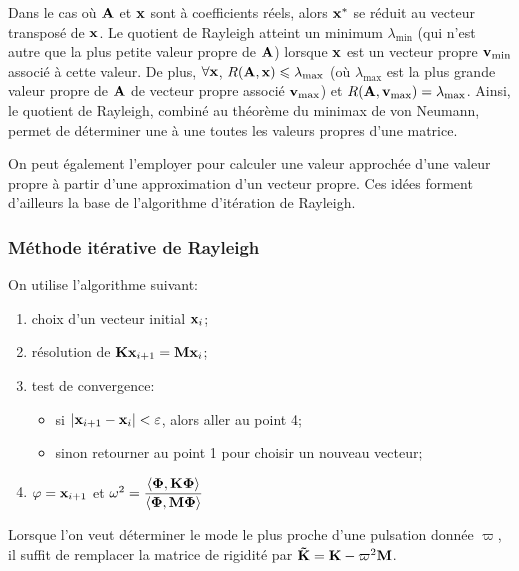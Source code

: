 Dans le cas où $\MM{A}$ et $\VV{x}$ sont à coefficients réels, alors $\VV{x}^{*}$ se réduit au vecteur transposé de $\VV{x}$.
\medskipvm
Le quotient de Rayleigh atteint un minimum $\lambda_{\min}$ (qui n'est autre que la plus petite valeur propre de $\MM{A}$)
lorsque $\VV{x}$ est un vecteur propre $\VV{v}_{\min}$ associé à cette valeur.
\medskipvm
De plus, $\forall \VV{x}$, $R(\MM{A}, \VV{x}) \leq \lambda_{\max}$ (où $\lambda_{\max}$ est la plus grande
valeur propre de $\MM{A}$ de vecteur propre associé $\VV{v}_{\max}$) et $R(\MM{A}, \VV{v}_{\max}) = \lambda_{\max}$.
Ainsi, le quotient de Rayleigh, combiné au théorème du minimax de von Neumann,
permet de déterminer une à une toutes les valeurs propres d'une matrice.

On peut également l'employer pour calculer une valeur approchée d'une valeur propre à partir d'une approximation
d'un vecteur propre.
Ces idées forment d'ailleurs la base de l’algorithme d’itération de Rayleigh.

\medskip
\subsubsection{Méthode itérative de Rayleigh}

On utilise l'algorithme suivant:
\begin{enumerate}
   \item choix d'un vecteur initial $\VV{x}_i$;
   \item résolution de $\MM{K}\VV{x}_{i+1} = \MM{M} \VV{x}_i$;
   \item test de convergence:
	\begin{itemize}
	   \item si $|\VV{x}_{i+1}-\VV{x}_i|<\varepsilon$, alors aller au point 4;
	   \item sinon retourner au point 1 pour choisir un nouveau vecteur;
	\end{itemize}
   \item $\VV{\varphi}=\VV{x}_{i+1}$ et $\omega^2=\dfrac{\langle \VV{\Phi}, \MM{K}\VV{\Phi}\rangle}{\langle \VV{\Phi}, \MM{M}\VV{\Phi}\rangle}$
\end{enumerate}
\medskipvm
Lorsque l'on veut déterminer le mode le plus proche d'une pulsation donnée $\varpi$, il suffit de remplacer
la matrice de rigidité par $\MM{\tilde{K}}=\MM{K} - \varpi^2 \MM{M}$.
\medskipvm
{}


